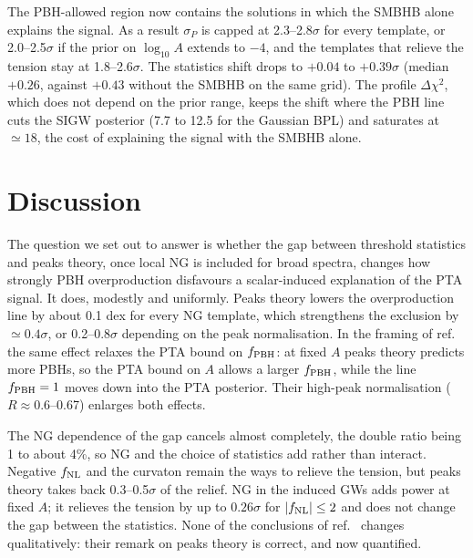 \documentclass[a4paper,11pt]{article}
\newcommand{\fnl}{f_{\rm NL}}
\newcommand{\fpbh}{f_{\rm PBH}}
\begin{document}
The PBH-allowed region now contains the solutions in which the SMBHB alone explains the signal.
As a result $\sigma_P$ is capped at 2.3--2.8$\sigma$ for every template, or 2.0--2.5$\sigma$ if
the prior on $\log_{10}A$ extends to $-4$, and the templates that relieve the tension stay at
1.8--2.6$\sigma$. The statistics shift drops to $+0.04$ to $+0.39\sigma$ (median $+0.26$, against
$+0.43$ without the SMBHB on the same grid). The profile $\Delta\chi^2$, which does not depend on
the prior range, keeps the shift where the PBH line cuts the SIGW posterior (7.7 to 12.5 for the
Gaussian BPL) and saturates at $\simeq18$, the cost of explaining the signal with the SMBHB alone.

\section{Discussion}\label{sec:disc}

The question we set out to answer is whether the gap between threshold statistics and peaks
theory, once local NG is included for broad spectra, changes how strongly PBH overproduction
disfavours a scalar-induced explanation of the PTA signal. It does, modestly and uniformly. Peaks
theory lowers the overproduction line by about 0.1 dex for every NG template, which strengthens
the exclusion by $\simeq0.4\sigma$, or 0.2--0.8$\sigma$ depending on the peak normalisation. In the
framing of ref.~\cite{Iovino24} the same effect relaxes the PTA bound on $\fpbh$: at fixed $A$
peaks theory predicts more PBHs, so the PTA bound on $A$ allows a larger $\fpbh$, while the line
$\fpbh=1$ moves down into the PTA posterior. Their high-peak normalisation ($R\approx0.6$--0.67)
enlarges both effects.

The NG dependence of the gap cancels almost completely, the double ratio being 1 to about 4\%, so
NG and the choice of statistics add rather than interact. Negative $\fnl$ and the curvaton remain
the ways to relieve the tension, but peaks theory takes back 0.3--0.5$\sigma$ of the relief. NG in
the induced GWs adds power at fixed $A$; it relieves the tension by up to $0.26\sigma$ for
$|\fnl|\le2$ and does not change the gap between the statistics. None of the conclusions of
ref.~\cite{FIVT23} changes qualitatively: their remark on peaks theory is correct, and now
quantified.
\end{document}
